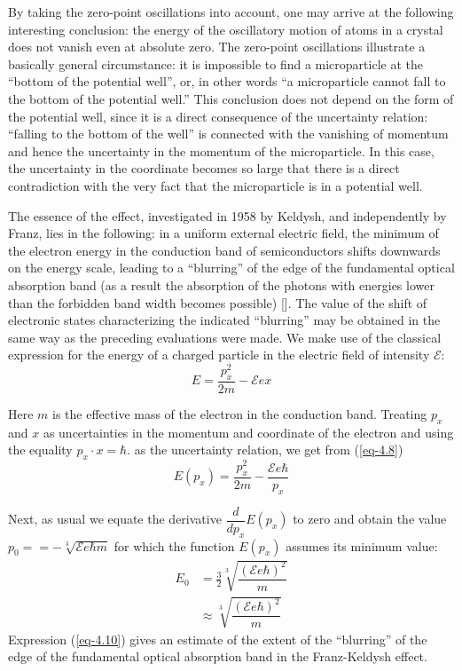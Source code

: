 \documentclass[a4paper,sfsidenotes,colorlinks=true]{tufte-book}
\numberwithin{equation}{section}
\numberwithin{figure}{section}
\newcommand{\Ea}{\mathcal{E}}
\begin{document}
By taking the zero-point oscillations into account, one may arrive at
the following interesting conclusion: the energy of the oscillatory
motion of atoms in a crystal does not vanish even at absolute zero.
The zero-point oscillations illustrate a basically general
circumstance: it is impossible to find a microparticle at the ``bottom
of the potential well'', or, in other words ``a microparticle cannot
fall to the bottom of the potential well.'' This conclusion does not
depend on the form of the potential well, since it is a direct
consequence of the uncertainty relation: ``falling to the bottom of the
well'' is connected with the vanishing of momentum and hence the
uncertainty in the momentum of the microparticle. In this case, the
uncertainty in the coordinate becomes so large that there is a direct
contradiction with the very fact that the microparticle is in a
potential well.

The essence of the
effect, investigated in 1958 by Keldysh, and independently by Franz,
lies in the following: in a uniform external electric field, the
minimum of the electron energy in the conduction band of
semiconductors shifts downwards on the energy scale, leading to a
``blurring'' of the edge of the fundamental optical absorption band
(as a result the absorption of the photons with energies lower than
the forbidden band width becomes possible) [\cite{22}]. The value of the
shift of electronic states characterizing the indicated ``blurring'' may
be obtained in the same way as the preceding evaluations were made. We
make use of the classical expression for the energy of a charged
particle in the electric field of intensity $\Ea$: 
\begin{equation}%
E = \frac{p_{x}^{2}}{2m}-\Ea ex 
\label{eq-4.8} 
\end{equation}

Here $m$ is the effective mass of the electron in the conduction
band. Treating $p_{x}$ and $x$ as uncertainties in the momentum and
coordinate of the electron and using the equality $p_{x} \cdot x = \hbar$. as the
uncertainty relation, we get from (\ref{eq-4.8}) 
\begin{equation}%
E(p_{x}) = \frac{p_{x}^{2}}{2m}-\frac{\Ea e \hbar}{p_{x}} 
\label{eq-4.9} 
\end{equation}

Next, as usual we equate the derivative $\dfrac{d}{dp_{x}} E (p_{x})$
to zero and obtain the value $p_{0}== - \sqrt[3]{\Ea e \hbar m}$ for
which the function $E(p_{x})$ assumes its minimum value:
\begin{equation}%
\begin{split}
E_{0} & = \frac{3}{2} \sqrt[3]{\dfrac{(\Ea e \hbar)^{2}}{m}} \\
& \approx \sqrt[3]{\dfrac{(\Ea e \hbar)^{2}}{m}} 
\end{split}
\label{eq-4.10}
\end{equation}
Expression (\ref{eq-4.10}) gives an estimate of the extent of the
``blurring'' of the edge of the fundamental optical absorption band in
the Franz-Keldysh effect.
\end{document}
